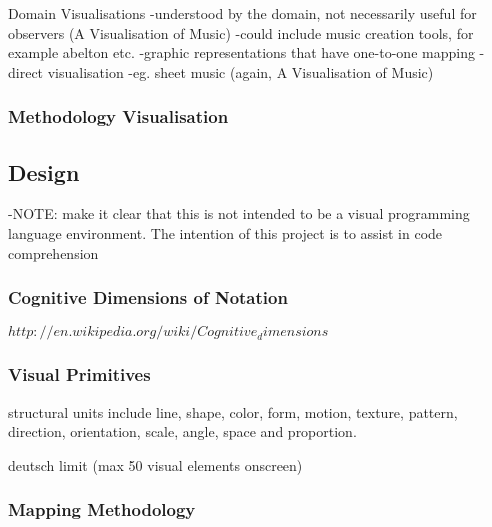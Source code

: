 Domain Visualisations
-understood by the domain, not necessarily useful for observers (A Visualisation of Music)
-could include music creation tools, for example abelton etc.
-graphic representations that have one-to-one mapping
-direct visualisation
-eg. sheet music (again, A Visualisation of Music)

\subsubsection{Methodology Visualisation}


\subsection{Design}

-NOTE: make it clear that this is not intended to be a visual programming language environment. The intention of this project is to assist in code comprehension 

\subsubsection{Cognitive Dimensions of Notation}
$http://en.wikipedia.org/wiki/Cognitive_dimensions$

\subsubsection{Visual Primitives}

structural units include line, shape, color, form, motion, texture, pattern, direction, orientation, scale, angle, space and proportion.

deutsch limit (max 50 visual elements onscreen)

\subsubsection{Mapping Methodology}



